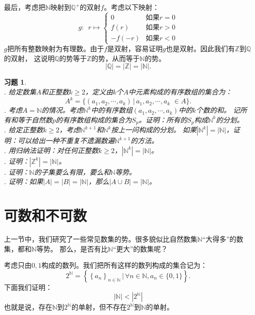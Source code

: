 \documentclass[12pt,UTF8]{ctexbook}
\theoremstyle{definition}
\theoremstyle{plain}
\newtheorem{sk}{思考}[section]
\newtheorem{xt}{习题}[section]
\begin{document}
最后，考虑把$\mathbb{N}$映射到$\mathbb{Q}^+$的双射$f$。考虑以下映射：
$$ g:\,\,\,r\mapsto \left\{
    \begin{array}{cl}
        0 & \mbox{如果}r = 0 \\
        f(r) & \mbox{如果}r > 0 \\
        -f(-r)  & \mbox{如果}r < 0 
    \end{array}\right.
$$
$g$把所有整数映射为有理数。由于$f$是双射，容易证明$g$也是双射。因此我们有$\mathbb{Z}$到$\mathbb{Q}$的双射，
这说明$\mathbb{Q}$的势等于$\mathbb{Z}$的势，从而等于$\mathbb{N}$的势。
$$ |\mathbb{Q}| = |\mathbb{Z}| = |\mathbb{N}|.$$



\begin{xt}
    \mbox{} \\
    . 给定数集$A$和正整数$k\geqslant 2$，定义由$k$个$A$中元素构成的有序数组的集合为：
    $$ A^k = \{(a_1, a_2, \cdots, a_k) \, | \, a_1, a_2, \cdots, a_k \,\, \in A \}.$$
    . 考虑$A = \mathbb{N}$的情况。考虑$\mathbb{N}^k$中的有序数组$(a_1, a_2, \cdots, a_k)$中的$k$个数的和。
    记所有和等于自然数$p$的有序数组构成的集合为$S_p$。证明：所有的$S_p$构成$\mathbb{N}^k$的分划。\\
    . 给定正整数$k\geqslant 2$，考虑$\mathbb{N}^{k+1}$和$\mathbb{N}^{k}$按上一问构成的分划。
    如果$|\mathbb{N}^k| = |\mathbb{N}|$，证明：可以给出一种不重复不遗漏数遍$\mathbb{N}^{k+1}$的方法。\\
    . 用归纳法证明：对任何正整数$k\geqslant 2$，$|\mathbb{N}^k| = |\mathbb{N}|$。\\
    . 证明：$|\mathbb{Z}^k| = |\mathbb{N}|$。\\
    . 证明：$\mathbb{N}$的子集要么有限，要么和$\mathbb{N}$等势。\\
    . 证明：如果$|A| = |B| = |\mathbb{N}|$，那么$|A\cup B| = |\mathbb{N}|$。
\end{xt}

\section{可数和不可数}
上一节中，我们研究了一些常见数集的势。很多貌似比自然数集$\mathbb{N}$“大得多”的数集，都和$\mathbb{N}$等势。
那么，是否有比$\mathbb{N}$“更大”的数集呢？

考虑只由$0,1$构成的数列。我们把所有这样的数列构成的集合记为：
$$ 2^\mathbb{N} = \left\{\left\{a_n\right\}_{n\in\mathbb{N}} \, | \, \forall n\in\mathbb{N}, a_n \in \{0, 1\} \right\}. $$
下面我们证明：
$$|\mathbb{N}| < |2^\mathbb{N}|$$
也就是说，存在$\mathbb{N}$到$2^\mathbb{N}$的单射，但不存在$2^\mathbb{N}$到$\mathbb{N}$的单射。
\end{document}
